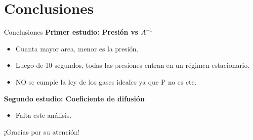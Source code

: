 \documentclass{beamer}
\begin{document}
\section{Conclusiones}
\begin{frame}{Conclusiones}
  \textbf{Primer estudio: Presión vs $A^{-1}$}
  \begin{itemize}
    \item Cuanta mayor area, menor es la presión.
    \item Luego de 10 segundos, todas las presiones entran en un régimen estacionario.
    \item NO se cumple la ley de los gases ideales ya que P no es cte.
  \end{itemize}
  \textbf{Segundo estudio: Coeficiente de difusión}
  \begin{itemize}
    \item Falta este análisis.
  \end{itemize}
\end{frame}

\begin{frame}{}
  \centering
  \Huge ¡Gracias por su atención!
\end{frame}
\end{document}
